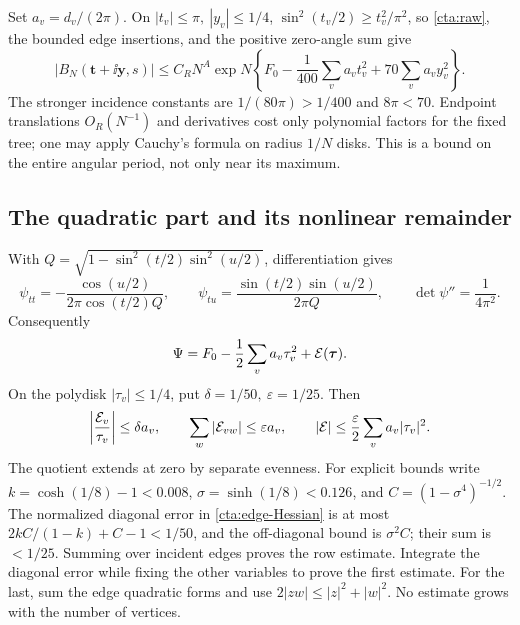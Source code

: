 Set \(a_v=d_v/(2\pi)\). On \(|t_v|\le\pi,\ |y_v|\le1/4\),
\(\sin^2(t_v/2)\ge t_v^2/\pi^2\), so \eqref{cta:raw},
the bounded edge insertions, and the positive zero-angle sum give
\begin{equation}\label{cta:global-Gaussian}
 |B_N(\mathbf t+\ii\mathbf y,s)|
 \le C_RN^A\exp N\left\{
 F_0-\frac1{400}\sum_va_vt_v^2+70\sum_va_vy_v^2\right\}.
\end{equation}
The stronger incidence constants are \(1/(80\pi)>1/400\)
and \(8\pi<70\).
Endpoint translations \(O_R(N^{-1})\) and derivatives cost
only polynomial factors for the fixed tree; one may apply
Cauchy's formula on radius \(1/N\) disks. This is a bound on
the entire angular period, not only near its maximum.

\subsection{The quadratic part and its nonlinear remainder}
With
\(Q=\sqrt{1-\sin^2(t/2)\sin^2(u/2)}\), differentiation gives
\begin{equation}\label{cta:edge-Hessian}
 \psi_{tt}=-\frac{\cos(u/2)}{2\pi\cos(t/2)Q},\qquad
 \psi_{tu}=\frac{\sin(t/2)\sin(u/2)}{2\pi Q},\qquad
 \det\psi''=\frac1{4\pi^2}.
\end{equation}
Consequently
\[
 \Psi=F_0-\frac12\sum_v a_v\tau_v^2+\mathcal E(\boldsymbol\tau).
 \]
On the polydisk \(|\tau_v|\le1/4\), put
\(\delta=1/50,\ \varepsilon=1/25\). Then
\begin{equation}\label{cta:error}
 \left|\frac{\mathcal E_v}{\tau_v}\right|\le\delta a_v,\qquad
 \sum_w|\mathcal E_{vw}|\le\varepsilon a_v,\qquad
 |\mathcal E|\le\frac{\varepsilon}{2}\sum_v a_v|\tau_v|^2 .
\end{equation}
The quotient extends at zero by separate evenness.
For explicit bounds write
\(k=\cosh(1/8)-1<0.008\), \(\sigma=\sinh(1/8)<0.126\),
and \(C=(1-\sigma^4)^{-1/2}\).
The normalized diagonal error in \eqref{cta:edge-Hessian}
is at most \(2kC/(1-k)+C-1<1/50\), and the off-diagonal
bound is \(\sigma^2C\); their sum is \(<1/25\).
Summing over incident edges proves the row estimate.
Integrate the diagonal error while fixing the other variables
to prove the first estimate. For the last, sum the edge
quadratic forms and use \(2|zw|\le|z|^2+|w|^2\).
No estimate grows with the number of vertices.
